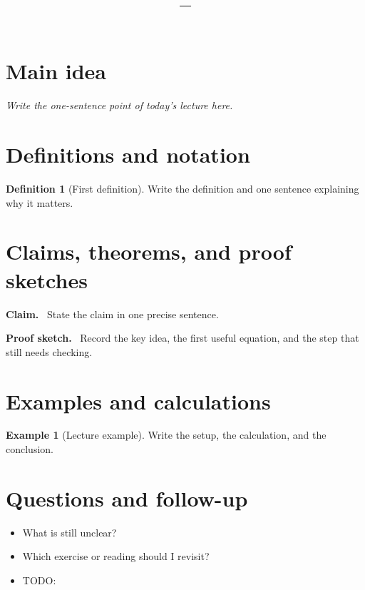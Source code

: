 \documentclass[11pt]{article}
\title{\vspace{-1.5em}\textbf{\coursename -- \lecturetitle}}
\author{\studentname}
\date{\lecturedate}
\newcommand{\1}{\mathbf{1}}
\theoremstyle{notestyle}
\theoremstyle{definition}
\newtheorem{definition}[theorem]{Definition}
\newtheorem{example}[theorem]{Example}
\newenvironment{claim}{\par\noindent\textbf{Claim.}\ }{\par}
\newenvironment{proofsketch}{\par\noindent\textbf{Proof sketch.}\ }{\par}
\begin{document}
\maketitle

\section{Main idea}
\textit{Write the one-sentence point of today's lecture here.}

\section{Definitions and notation}
\begin{definition}[First definition]
Write the definition and one sentence explaining why it matters.
\end{definition}

\section{Claims, theorems, and proof sketches}
\begin{claim}
State the claim in one precise sentence.
\end{claim}

\begin{proofsketch}
Record the key idea, the first useful equation, and the step that still needs checking.
\end{proofsketch}

\section{Examples and calculations}
\begin{example}[Lecture example]
Write the setup, the calculation, and the conclusion.
\end{example}

\section{Questions and follow-up}
\begin{itemize}
  \item What is still unclear?
  \item Which exercise or reading should I revisit?
  \item TODO: 
\end{itemize}
\end{document}
